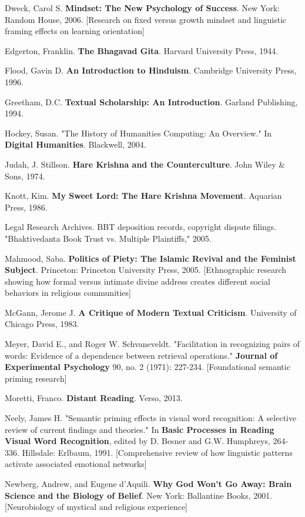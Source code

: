 \documentclass[12pt,twoside]{book}
\begin{document}
Dweck, Carol S. \textbf{Mindset: The New Psychology of Success}. New York: Random House, 2006. [Research on fixed versus growth mindset and linguistic framing effects on learning orientation]

Edgerton, Franklin. \textbf{The Bhagavad Gita}. Harvard University Press, 1944.

Flood, Gavin D. \textbf{An Introduction to Hinduism}. Cambridge University Press, 1996.

Greetham, D.C. \textbf{Textual Scholarship: An Introduction}. Garland Publishing, 1994.

Hockey, Susan. "The History of Humanities Computing: An Overview." In \textbf{Digital Humanities}. Blackwell, 2004.

Judah, J. Stillson. \textbf{Hare Krishna and the Counterculture}. John Wiley \& Sons, 1974.

Knott, Kim. \textbf{My Sweet Lord: The Hare Krishna Movement}. Aquarian Press, 1986.

Legal Research Archives. BBT deposition records, copyright dispute filings. "Bhaktivedanta Book Trust vs. Multiple Plaintiffs," 2005.

Mahmood, Saba. \textbf{Politics of Piety: The Islamic Revival and the Feminist Subject}. Princeton: Princeton University Press, 2005. [Ethnographic research showing how formal versus intimate divine address creates different social behaviors in religious communities]

McGann, Jerome J. \textbf{A Critique of Modern Textual Criticism}. University of Chicago Press, 1983.

Meyer, David E., and Roger W. Schvaneveldt. "Facilitation in recognizing pairs of words: Evidence of a dependence between retrieval operations." \textbf{Journal of Experimental Psychology} 90, no. 2 (1971): 227-234. [Foundational semantic priming research]

Moretti, Franco. \textbf{Distant Reading}. Verso, 2013.

Neely, James H. "Semantic priming effects in visual word recognition: A selective review of current findings and theories." In \textbf{Basic Processes in Reading Visual Word Recognition}, edited by D. Besner and G.W. Humphreys, 264-336. Hillsdale: Erlbaum, 1991. [Comprehensive review of how linguistic patterns activate associated emotional networks]

Newberg, Andrew, and Eugene d'Aquili. \textbf{Why God Won't Go Away: Brain Science and the Biology of Belief}. New York: Ballantine Books, 2001. [Neurobiology of mystical and religious experience]
\end{document}
